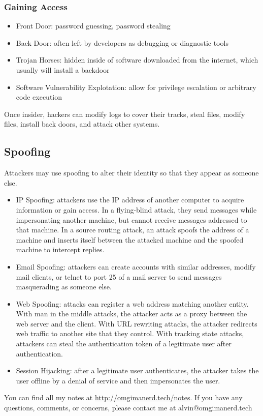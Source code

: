 \documentclass{math}
\begin{document}
\subsubsection*{Gaining Access}
\begin{itemize}
  \item Front Door: password guessing, password stealing
  \item Back Door: often left by developers as debugging or diagnostic tools
  \item Trojan Horses: hidden inside of software downloaded from the internet,
    which usually will install a backdoor
  \item Software Vulnerability Explotation: allow for privilege escalation or
    arbitrary code execution
\end{itemize}
Once insider, hackers can modify logs to cover their tracks, steal files, modify
files, install back doors, and attack other systems.

\subsection*{Spoofing}
Attackers may use spoofing to alter their identity so that they appear as
someone else.
\begin{itemize}
  \item IP Spoofing: attackers use the IP address of another computer to
    acquire information or gain access. In a flying-blind attack, they
    send messages while impersonating another machine, but cannot receive
    messages addressed to that machine. In a source routing attack, an
    attack spoofs the address of a machine and inserts itself between the
    attacked machine and the spoofed machine to intercept replies.
  \item Email Spoofing: attackers can create accounts with similar addresses,
    modify mail clients, or telnet to port 25 of a mail server to send
    messages masquerading as someone else.
  \item Web Spoofing: attacks can register a web address matching another
    entity. With man in the middle attacks, the attacker acts as a proxy
    between the web server and the client. With URL rewriting attacks, the
    attacker redirects web traffic to another site that they control. With
    tracking state attacks, attackers can steal the authentication token of a
    legitimate user after authentication.
  \item Session Hijacking: after a legitimate user authenticates, the attacker
    takes the user offline by a denial of service and then impersonates the
    user.
\end{itemize}

\begin{center}
  You can find all my notes at \url{http://omgimanerd.tech/notes}. If you have
  any questions, comments, or concerns, please contact me at
  alvin@omgimanerd.tech
\end{center}
\end{document}
